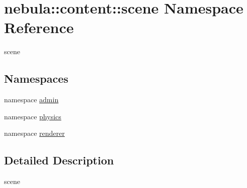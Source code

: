 \hypertarget{namespacenebula_1_1content_1_1scene}{
\section{nebula::content::scene Namespace Reference}
\label{namespacenebula_1_1content_1_1scene}
}


scene  
\subsection*{Namespaces}
\begin{DoxyCompactItemize}
\item 
namespace \hyperlink{namespacenebula_1_1content_1_1scene_1_1admin}{admin}
\item 
namespace \hyperlink{namespacenebula_1_1content_1_1scene_1_1physics}{physics}
\item 
namespace \hyperlink{namespacenebula_1_1content_1_1scene_1_1renderer}{renderer}
\end{DoxyCompactItemize}


\subsection{Detailed Description}
scene 